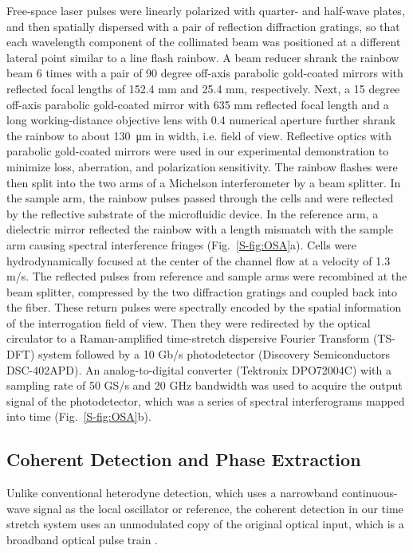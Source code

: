\documentclass[aps,pra,reprint,superscriptaddress]{revtex4-1}
\begin{document}
Free-space laser pulses were linearly polarized with quarter- and half-wave plates, and then spatially dispersed with a pair of reflection diffraction gratings, so that each wavelength component of the collimated beam was positioned at a different lateral point similar to a line flash rainbow. A beam reducer shrank the rainbow beam 6 times with a pair of 90 degree off-axis parabolic gold-coated mirrors with reflected focal lengths of 152.4 mm and 25.4 mm, respectively. Next, a 15 degree off-axis parabolic gold-coated mirror with 635 mm reflected focal length and a long working-distance objective lens with 0.4 numerical aperture further shrank the rainbow to about \SI{130}{\micro\meter} in width, i.e. field of view. Reflective optics with parabolic gold-coated mirrors were used in our experimental demonstration to minimize loss, aberration, and polarization sensitivity. The rainbow flashes were then split into the two arms of a Michelson interferometer by a beam splitter. In the sample arm, the rainbow pulses passed through the cells and were reflected by the reflective substrate of the microfluidic device. In the reference arm, a dielectric mirror reflected the rainbow with a length mismatch with the sample arm causing spectral interference fringes (Fig.~\ref{S-fig:OSA}a). Cells were hydrodynamically focused at the center of the channel flow at a velocity of 1.3 m/s. The reflected pulses from reference and sample arms were recombined at the beam splitter, compressed by the two diffraction gratings and coupled back into the fiber. These return pulses were spectrally encoded by the spatial information of the interrogation field of view. Then they were redirected by the optical circulator to a Raman-amplified time-stretch dispersive Fourier Transform (TS-DFT) system followed by a 10 Gb/s photodetector (Discovery Semiconductors DSC-402APD). An analog-to-digital converter (Tektronix DPO72004C) with a sampling rate of 50 GS/s and 20 GHz bandwidth was used to acquire the output signal of the photodetector, which was a series of spectral interferograms mapped into time (Fig.~\ref{S-fig:OSA}b). 

\subsection*{Coherent Detection and Phase Extraction}

Unlike conventional heterodyne detection, which uses a narrowband continuous-wave signal as the local oscillator or reference, the coherent detection in our time stretch system uses an unmodulated copy of the original optical input, which is a broadband optical pulse train \cite{buckley2013coherent, devore2014coherent}. 
\end{document}

